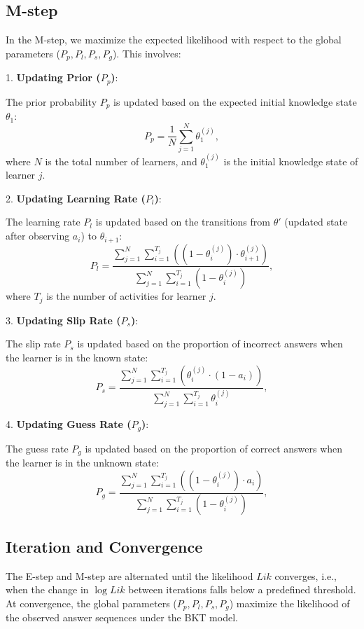 \documentclass{article}
\begin{document}
\subsection{M-step}
In the M-step, we maximize the expected likelihood with respect to the global parameters (\(P_p, P_l, P_s, P_g\)). This involves:

1. \textbf{Updating Prior (\(P_p\))}:

    The prior probability \(P_p\) is updated based on the expected initial knowledge state \(\theta_1\):
    \[
    P_p = \frac{1}{N} \sum_{j=1}^N \theta_1^{(j)},
    \]
    where \(N\) is the total number of learners, and \(\theta_1^{(j)}\) is the initial knowledge state of learner \(j\).

2. \textbf{Updating Learning Rate (\(P_l\))}:

    The learning rate \(P_l\) is updated based on the transitions from \(\theta'\) (updated state after observing \(a_i\)) to \(\theta_{i+1}\):
    \[
    P_l = \frac{\sum_{j=1}^N \sum_{i=1}^{T_j} \left( (1 - \theta_i^{(j)}) \cdot \theta_{i+1}^{(j)} \right)}{\sum_{j=1}^N \sum_{i=1}^{T_j} (1 - \theta_i^{(j)})},
    \]
    where \(T_j\) is the number of activities for learner \(j\).

3. \textbf{Updating Slip Rate (\(P_s\))}:

    The slip rate \(P_s\) is updated based on the proportion of incorrect answers when the learner is in the known state:
    \[
    P_s = \frac{\sum_{j=1}^N \sum_{i=1}^{T_j} \left( \theta_i^{(j)} \cdot (1 - a_i) \right)}{\sum_{j=1}^N \sum_{i=1}^{T_j} \theta_i^{(j)}},
    \]

4. \textbf{Updating Guess Rate (\(P_g\))}:

    The guess rate \(P_g\) is updated based on the proportion of correct answers when the learner is in the unknown state:
    \[
    P_g = \frac{\sum_{j=1}^N \sum_{i=1}^{T_j} \left( (1 - \theta_i^{(j)}) \cdot a_i \right)}{\sum_{j=1}^N \sum_{i=1}^{T_j} (1 - \theta_i^{(j)})},
    \]

\subsection{Iteration and Convergence}
The E-step and M-step are alternated until the likelihood \(Lik\) converges, i.e., when the change in \(\log Lik\) between iterations falls below a predefined threshold. At convergence, the global parameters (\(P_p, P_l, P_s, P_g\)) maximize the likelihood of the observed answer sequences under the BKT model.
\end{document}

